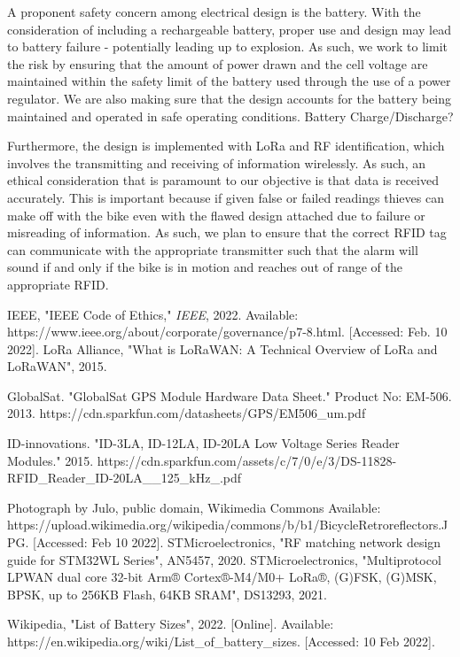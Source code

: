 \documentclass{article}
\begin{document}
A proponent safety concern among electrical design is the battery. With the consideration of including a rechargeable battery, proper use and design may lead to battery failure - potentially leading up to explosion. As such, we work to limit the risk by ensuring that the amount of power drawn and the cell voltage are maintained within the safety limit of the battery used through the use of a power regulator. We are also making sure that the design accounts for the battery being maintained and operated in safe operating conditions.
Battery Charge/Discharge?

Furthermore, the design is implemented with LoRa and RF identification, which involves the transmitting and receiving of information wirelessly. As such, an ethical consideration that is paramount to our objective is that data is received accurately. This is important because if given false or failed readings thieves can make off with the bike even with the flawed design attached due to failure or misreading of information. As such, we plan to ensure that the correct RFID tag can communicate with the appropriate transmitter such that the alarm will sound if and only if the bike is in motion and reaches out of range of the appropriate RFID. 

\begin{thebibliography}{}
	 IEEE, "IEEE Code of Ethics," \textit{IEEE}, 2022. Available: https://www.ieee.org/about/corporate/governance/p7-8.html. [Accessed: Feb. 10 2022].
	 LoRa Alliance, "What is LoRaWAN: A Technical Overview of LoRa and LoRaWAN", 2015.
	
	 GlobalSat. "GlobalSat GPS Module Hardware Data Sheet." Product No: EM-506. 2013. https://cdn.sparkfun.com/datasheets/GPS/EM506\_um.pdf
	
	 ID-innovations. "ID-3LA, ID-12LA, ID-20LA Low Voltage Series Reader Modules." 2015. https://cdn.sparkfun.com/assets/c/7/0/e/3/DS-11828-RFID\_Reader\_ID-20LA\_\_125\_kHz\_.pdf
	
	 Photograph by Julo, public domain, Wikimedia Commons Available: https://upload.wikimedia.org/wikipedia/commons/b/b1/BicycleRetroreflectors.JPG. [Accessed: Feb 10 2022]. 
	 STMicroelectronics, "RF matching network design guide for STM32WL Series", AN5457, 2020. 
	 STMicroelectronics, "Multiprotocol LPWAN dual core 32-bit Arm® Cortex®-M4/M0+	LoRa®, (G)FSK, (G)MSK, BPSK, up to 256KB Flash, 64KB SRAM", DS13293, 2021.
	
	
	
	 Wikipedia, "List of Battery Sizes", 2022. [Online]. Available: https://en.wikipedia.org/wiki/List\_of\_battery\_sizes. [Accessed: 10 Feb 2022]. 
	
	
	
\end{thebibliography}
\end{document}
